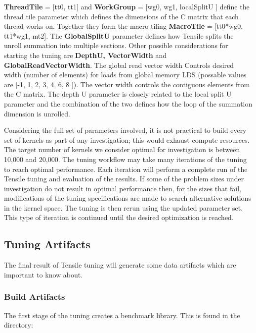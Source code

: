 \documentclass[]{article}
\begin{document}
{\color{ForestGreen} \bf ThreadTile} = [tt0, tt1] and {\color{ForestGreen} \bf  WorkGroup} = [wg0, wg1, localSplitU ] define the thread tile parameter which defines the dimensions of the C matrix that each thread works on. Together they form the macro tiling {\color{ForestGreen} \bf MacroTile} = [tt0*wg0, tt1*wg1, mt2]. The {\color{ForestGreen} \bf GlobalSplitU} parameter defines how Tensile splits the unroll summation into multiple sections. Other possible considerations for starting the tuning are {\color{ForestGreen} \bf DepthU, VectorWidth} and {\color{ForestGreen} \bf GlobalReadVectorWidth}. The global read vector width Controls desired width (number of elements) for loads from global memory LDS (possable values are [-1, 1, 2, 3, 4, 6, 8 ]). The vector width controls the contiguous elements from the C matrix. The depth U parameter is closely related to the local split U parameter and the combination of the two defines how the loop of the summation dimension is unrolled.

Considering the full set of parameters involved, it is not practical to build every set of kernels as part of any investigation; this would exhaust compute resources. The target number of kernels we consider optimal for investigation is between 10,000 and 20,000. The tuning workflow may take many iterations of the tuning to reach optimal performance. Each iteration will perform a complete run of the Tensile tuning and evaluation of the results. If some of the problem sizes under investigation do not result in optimal performance then, for the sizes that fail, modifications of the tuning specifications are made to search alternative solutions in the kernel space. The tuning is then rerun using the updated parameter set. This type of iteration is continued until the desired optimization is reached.

\subsection{Tuning Artifacts}
The final result of Tensile tuning will generate some data artifacts which are important to know about.

\subsubsection{Build Artifacts}
The first stage of the tuning creates a benchmark library. This is found in the directory:
\end{document}
